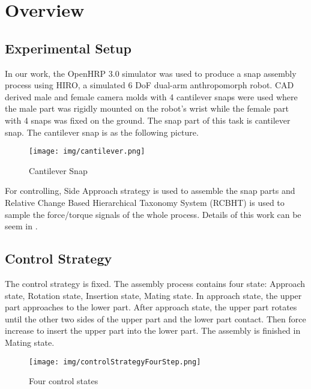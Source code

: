 %

\chapter{Overview}
\section{Experimental Setup}
In our work, the OpenHRP 3.0 simulator was used to produce a snap assembly process using HIRO, a simulated 6 DoF dual-arm anthropomorph robot. CAD derived male and female camera molds with 4 cantilever snaps were used where the male part was rigidly mounted on the robot's wrist while the female part with 4 snaps was fixed on the ground. The snap part of this task is cantilever snap. The cantilever snap is as the following picture. \\

\begin{figure}
    \centering
    \texttt{[image: img/cantilever.png]}
    \caption{Cantilever Snap}
    \label{snap}
\end{figure}
\indent For controlling, Side Approach strategy \cite{2012ICMA-Rojas-PivotApproach} is used to assemble the snap parts and Relative Change Based Hierarchical Taxonomy System (RCBHT) is used to sample the force/torque signals of the whole process. Details of this work can be seem in \cite{2013IJMA-Rojas-TwrdsSnapSensing}.
\section{Control Strategy}
The control strategy is fixed. The assembly process contains four state: Approach state, Rotation state, Insertion state, Mating state. In approach state, the upper part approaches to the lower part. After approach state, the upper part rotates until the other two sides of the upper part and the lower part contact. Then force increase to insert the upper part into the lower part. The assembly is finished in Mating state. \\
\begin{figure}[h]
    \centering
    \texttt{[image: img/controlStrategyFourStep.png]}
    \caption{Four control states}
    \label{RCBHT}
\end{figure} 
